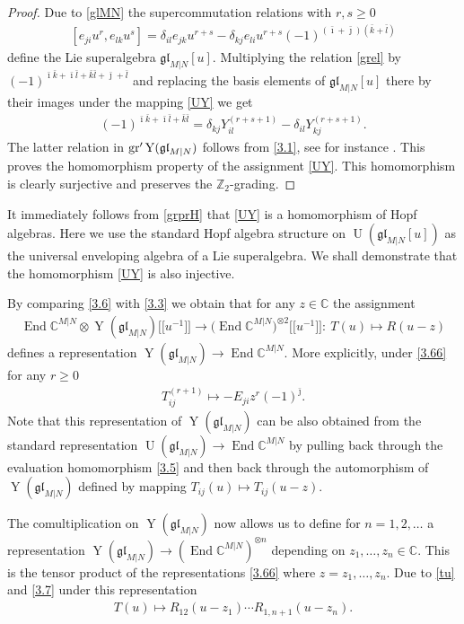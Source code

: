 \documentclass[pdftex]{sigma}
\numberwithin{equation}{section}
\def\bi{{\bar\imath }}
\def\bj{{\bar\jmath }}
\def\bk{{\bar k }}
\def\bl{{\bar l }}
\def\CC{{\mathbb{C}}}
\def\CMN{\CC^{M|N}}
\def\de{\delta}
\def\End{\operatorname{End}}
\def\g{\glMN [u]}
\def\ge{\geqslant}
\def\glMN{\mathfrak{gl}_{M|N}}
\def\grpr{{\rm gr}^{\prime} }
\def\ot{\otimes}
\def\UMN{\operatorname{U}(\glMN)}
\def\Ug{\operatorname{U}(\g)}
\def\YMN{\operatorname{Y}(\glMN)}
\def\ZZ{\mathbb{Z}}
\begin{document}
\begin{proof}
Due to \eqref{glMN} the supercommutation relations with $r ,s\ge0$
\begin{gather}
\label{grel}
[ e_{ji} u^{r}, e_{lk} u^{s} ]=
\de_{il} e_{jk} u^{r+s}-
\de_{kj} e_{li} u^{r+s}
{(-1)}^{( \bi+ \bj )( \bk+ \bl )}
\end{gather}
define the Lie superalgebra $\g $.
Multiplying the relation \eqref{grel} by
$(-1)^{\bi \bk + \bi \bl + \bk \bl+\bj+\bl}$
and replacing the basis elements of $\g$ there by their images
under the mapping \eqref{UY} we get
\begin{gather*}
[ Y_{ij}^{(r+1)},Y_{kl}^{(s+1)} \bigr]
(-1)^{\bi \bk + \bi \bl + \bk \bl}=
\de_{kj} Y_{il}^{(r+s+1)}-\de_{il} Y_{kj}^{(r+s+1)} .
\end{gather*}
The latter relation in $\grpr\YMN$ follows from \eqref{3.1},
see for instance \cite[Section 1]{MNO}.
This proves the homomorphism property of the assignment \eqref{UY}.
This homomorphism is clearly surjective
and preserves the $\ZZ_{2}$-grading.
\end{proof}

It immediately follows from \eqref{grprH} that
\eqref{UY} is a homomorphism of Hopf algebras.
Here we use the standard Hopf algebra structure on $\Ug$
as the universal enveloping algebra of a Lie superalgebra.
We shall demonstrate that the homomorphism \eqref{UY} is also injective.

By comparing \eqref{3.6} with \eqref{3.3}
we obtain that for any $z\in\CC$ the assignment
\begin{gather}\label{3.66}
\End\CMN\ot\YMN \big[\big[u^{-1}\big]\big]
\to
\big(\End\CMN\big)^{\ot 2} \big[\big[u^{-1}\big]\big]\colon \
T(u)\mapsto R(u-z)
\end{gather}
defines a representation $\YMN\to\End\CMN$. More explicitly, under
\eqref{3.66} for any $r\ge0$
\begin{gather}
\label{2.19}
T_{ij}^{(r+1)}\mapsto
- E_{ji} z^{r} {(-1)}^{\bj} .
\end{gather}
Note that this representation of $\YMN$
can be also obtained from the standard representation $\UMN\to\End\CMN$
by pulling back through the evaluation homomorphism \eqref{3.5}
and then back through the automorphism of $\YMN$ defined by mapping
$
T_{ij}(u)\mapsto T_{ij}(u-z) .
$

The comultiplication on $\YMN$
now allows us to define for $n=1 ,2 , \dots$ a representation
$\YMN\to(\End\CMN)^{\ot n}$ depending on
$z_1,\dots, z_n\in\CC $. This is the tensor product of
the representations \eqref{3.66} where $z=z_1,\dots, z_n $.
Due to \eqref{tu} and \eqref{3.7} under this representation
\begin{gather}\label{3.666}
T(u)\mapsto R_{12}(u-z_1) \cdots R_{1,n+1}(u-z_n) .
\end{gather}
\end{document}
